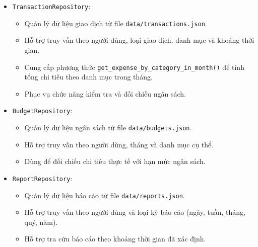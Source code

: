 \documentclass[12pt,letterpaper]{article}
\begin{document}
\begin{itemize}
\begin{itemize}
    \item \texttt{TransactionRepository}:
    \begin{itemize}
        \item Quản lý dữ liệu giao dịch từ file \texttt{data/transactions.json}.
        \item Hỗ trợ truy vấn theo người dùng, loại giao dịch, danh mục và khoảng thời gian.
        \item Cung cấp phương thức \texttt{get\_expense\_by\_category\_in\_month()} để tính tổng chi tiêu theo danh mục trong tháng.
        \item Phục vụ chức năng kiểm tra và đối chiếu ngân sách.
    \end{itemize}

    \item \texttt{BudgetRepository}:
    \begin{itemize}
        \item Quản lý dữ liệu ngân sách từ file \texttt{data/budgets.json}.
        \item Hỗ trợ truy vấn theo người dùng, tháng và danh mục cụ thể.
        \item Dùng để đối chiếu chi tiêu thực tế với hạn mức ngân sách.
    \end{itemize}

    \item \texttt{ReportRepository}:
    \begin{itemize}
        \item Quản lý dữ liệu báo cáo từ file \texttt{data/reports.json}.
        \item Hỗ trợ truy vấn theo người dùng và loại kỳ báo cáo (ngày, tuần, tháng, quý, năm).
        \item Hỗ trợ tra cứu báo cáo theo khoảng thời gian đã xác định.
    \end{itemize}
\end{itemize}
\end{itemize}
\end{document}
